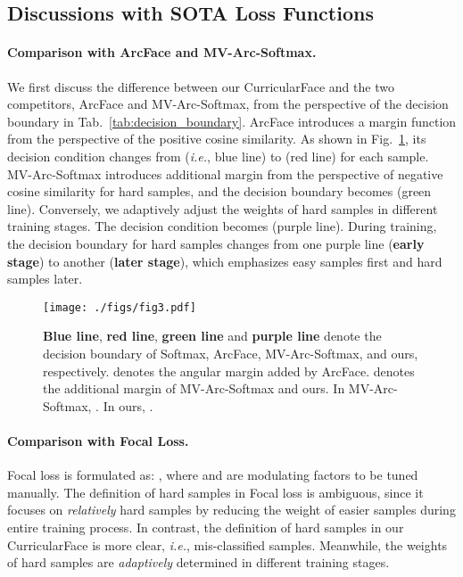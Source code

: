 \documentclass[10pt,twocolumn,letterpaper]{article}
\def\figvspace{{\vspace{-2mm}}}
\begin{document}
\subsection{Discussions with SOTA Loss Functions}
\paragraph{Comparison with ArcFace and MV-Arc-Softmax.}
We first discuss the difference between our CurricularFace and the two competitors, ArcFace and MV-Arc-Softmax, from the perspective of the decision boundary in Tab.~\ref{tab:decision_boundary}.
ArcFace introduces a margin function  from the perspective of the positive cosine similarity.
As shown in Fig.~\ref{fig:loss_comp}, its decision condition changes from  (\textit{i.e.}, blue line) to  (red line) for each sample.
MV-Arc-Softmax introduces additional margin from the perspective of negative cosine similarity for hard samples, and the decision boundary becomes  (green line).
Conversely, we adaptively adjust the weights of hard samples in different training stages.
The decision condition becomes  (purple line).
During training, the decision boundary for hard samples changes from one purple line (\textbf{early stage}) to another (\textbf{later stage}), which emphasizes easy samples first and hard samples later.




\begin{figure}[t]
 \centering
 \texttt{[image: ./figs/fig3.pdf]}
 \caption{\small 
\textbf{Blue line}, \textbf{red line}, \textbf{green line} and \textbf{purple line} denote the decision boundary of Softmax, ArcFace, MV-Arc-Softmax, and ours, respectively.  denotes the angular margin added by ArcFace.  denotes the additional margin of MV-Arc-Softmax and ours. In MV-Arc-Softmax, . In ours, .
 }
 \label{fig:loss_comp}
 \figvspace
\end{figure}

\vspace{-3mm}
\paragraph{Comparison with Focal Loss.}
Focal loss is formulated as: ,
where  and  are modulating factors to be tuned manually.
The definition of hard samples in Focal loss is ambiguous, since it focuses on \textit{relatively} hard samples by reducing the weight of easier samples during entire training process.
In contrast, the definition of hard samples in our CurricularFace is more clear, \textit{i.e.}, mis-classified samples.
Meanwhile, the weights of hard samples are \textit{adaptively} determined in different training stages.
\end{document}
